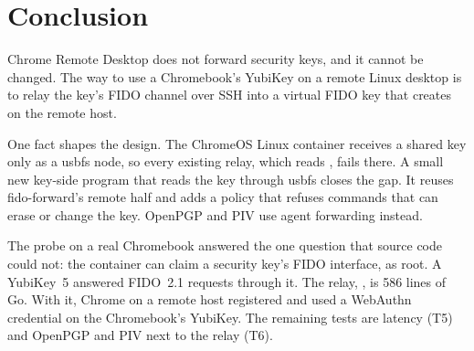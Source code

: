 \section{Conclusion}
\label{sec:conclusion}

Chrome Remote Desktop does not forward security keys, and it cannot be
changed. The way to use a Chromebook's YubiKey on a remote Linux desktop is
to relay the key's FIDO channel over SSH into a virtual FIDO key that
 creates on the remote host.

One fact shapes the design. The ChromeOS Linux container receives a shared
key only as a usbfs node, so every existing relay, which reads
, fails there. A small new key-side program that reads the key
through usbfs closes the gap. It reuses fido-forward's remote half and adds a
policy that refuses commands that can erase or change the key. OpenPGP and
PIV use agent forwarding instead.

The probe on a real Chromebook answered the one question that source code
could not: the container can claim a security key's FIDO interface, as root.
A YubiKey~5 answered FIDO~2.1 requests through it. The relay,
, is 586 lines of Go. With it, Chrome on a remote host
registered and used a WebAuthn credential on the Chromebook's YubiKey. The
remaining tests are latency (T5) and OpenPGP and PIV next to the relay
(T6).
